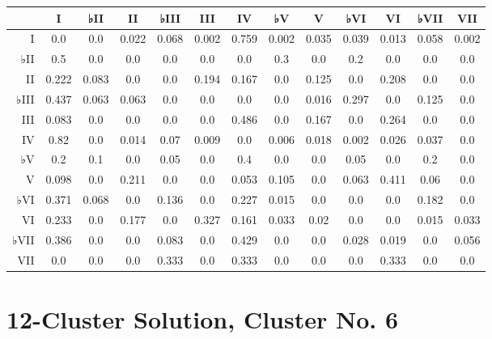 \begin{table}[htbp]
\begin{minipage}{\linewidth}
\setlength{\tymax}{0.5\linewidth}
\centering
\small
\begin{tabulary}{\textwidth}{@{}RCCCCCCCCCCCC@{}} \toprule
&I&♭II&II&♭III&III&IV&♭V&V&♭VI&VI&♭VII&VII\\
\midrule
I&0.0&0.0&0.022&0.068&0.002&0.759&0.002&0.035&0.039&0.013&0.058&0.002\\
♭II&0.5&0.0&0.0&0.0&0.0&0.0&0.3&0.0&0.2&0.0&0.0&0.0\\
II&0.222&0.083&0.0&0.0&0.194&0.167&0.0&0.125&0.0&0.208&0.0&0.0\\
♭III&0.437&0.063&0.063&0.0&0.0&0.0&0.0&0.016&0.297&0.0&0.125&0.0\\
III&0.083&0.0&0.0&0.0&0.0&0.486&0.0&0.167&0.0&0.264&0.0&0.0\\
IV&0.82&0.0&0.014&0.07&0.009&0.0&0.006&0.018&0.002&0.026&0.037&0.0\\
♭V&0.2&0.1&0.0&0.05&0.0&0.4&0.0&0.0&0.05&0.0&0.2&0.0\\
V&0.098&0.0&0.211&0.0&0.0&0.053&0.105&0.0&0.063&0.411&0.06&0.0\\
♭VI&0.371&0.068&0.0&0.136&0.0&0.227&0.015&0.0&0.0&0.0&0.182&0.0\\
VI&0.233&0.0&0.177&0.0&0.327&0.161&0.033&0.02&0.0&0.0&0.015&0.033\\
♭VII&0.386&0.0&0.0&0.083&0.0&0.429&0.0&0.0&0.028&0.019&0.0&0.056\\
VII&0.0&0.0&0.0&0.333&0.0&0.333&0.0&0.0&0.0&0.333&0.0&0.0\\

\bottomrule

\end{tabulary}
\end{minipage}
\end{table}

\section{12-Cluster Solution, Cluster No. 6}
\label{12-clustersolutionclusterno.6}

